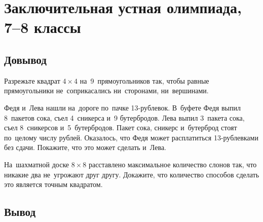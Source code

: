 

\section*{Заключительная устная олимпиада, 7--8 классы}





\subsection*{Довывод}

\begin{problems}

\item
Разрежьте квадрат $4 \times 4$ на~9~прямоугольников так, чтобы равные
прямоугольники не~соприкасались ни~сторонами, ни~вершинами.


\item
Федя и~Лева нашли на~дороге по~пачке 13-рублевок.
В~буфете Федя выпил 8~пакетов сока, съел 4~сникерса и~9 бутербродов.
Лева выпил 3~пакета сока, съел 8~сникерсов и~5~бутербродов.
Пакет сока, сникерс и~бутерброд стоят по~целому числу рублей.
Оказалось, что Федя может расплатиться 13-рублевками без сдачи.
Покажите, что это может сделать и~Лева.

\item
На~шахматной доске $8 \times 8$ расставлено максимальное количество слонов так,
что никакие два не~угрожают друг другу.
Докажите, что количество способов сделать это является точным квадратом.

\end{problems}


\subsection*{Вывод}


